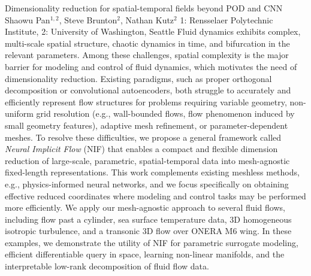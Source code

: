 \begin{addmargin}[2em]{0em}
\vspace{1.5ex}
\abs
{Dimensionality reduction for spatial-temporal fields beyond POD and CNN}
{Shaowu Pan$^{1,2}$, Steve Brunton$^{2}$, Nathan Kutz$^{2}$}
{1: Rensselaer Polytechnic Institute, 2: University of Washington, Seattle}
{Fluid dynamics exhibits complex, multi-scale spatial structure, chaotic dynamics in time, and bifurcation in the relevant parameters. Among these challenges, spatial complexity is the major barrier for modeling and control of fluid dynamics, which motivates the need of dimensionality reduction. Existing paradigms, such as proper orthogonal decomposition or convolutional autoencoders, both struggle to accurately and efficiently represent flow structures for problems requiring variable geometry, non-uniform grid resolution (e.g., wall-bounded flows, flow phenomenon induced by small geometry features), adaptive mesh refinement, or parameter-dependent meshes. To resolve these difficulties, we propose a general framework called \textit{Neural Implicit Flow} (NIF) that enables a compact and flexible dimension reduction of large-scale, parametric, spatial-temporal data into mesh-agnostic fixed-length representations. This work complements existing meshless methods, e.g., physics-informed neural networks, and we focus specifically on obtaining effective reduced coordinates where modeling and control tasks may be performed more efficiently. We apply our mesh-agnostic approach to several fluid flows, including flow past a cylinder, sea surface temperature data, 3D homogeneous isotropic turbulence, and a transonic 3D flow over ONERA M6 wing. In these examples, we demonstrate the utility of NIF for parametric surrogate modeling, efficient differentiable query in space, learning non-linear manifolds, and the interpretable low-rank decomposition of fluid flow data.}



\end{addmargin}
